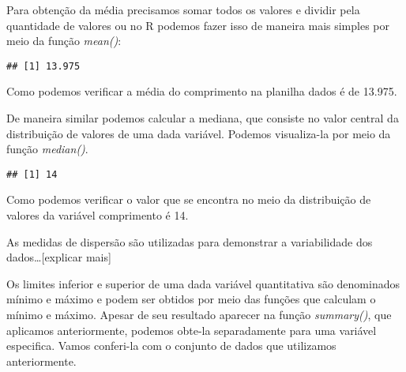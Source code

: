 \documentclass[]{book}
\newenvironment{Shaded}{\begin{snugshade}}{\end{snugshade}}
\newcommand{\KeywordTok}[1]{\textcolor[rgb]{0.13,0.29,0.53}{\textbf{#1}}}
\newcommand{\NormalTok}[1]{#1}
\newcommand{\OperatorTok}[1]{\textcolor[rgb]{0.81,0.36,0.00}{\textbf{#1}}}
\begin{document}
Para obtenção da média precisamos somar todos os valores e dividir pela quantidade de valores ou no R podemos fazer isso de maneira mais simples por meio da função \emph{mean()}:

\begin{Shaded}
\end{Shaded}

\begin{verbatim}
## [1] 13.975
\end{verbatim}

Como podemos verificar a média do comprimento na planilha dados é de 13.975.

De maneira similar podemos calcular a mediana, que consiste no valor central da distribuição de valores de uma dada variável. Podemos visualiza-la por meio da função \emph{median()}.

\begin{Shaded}
\end{Shaded}

\begin{verbatim}
## [1] 14
\end{verbatim}

Como podemos verificar o valor que se encontra no meio da distribuição de valores da variável comprimento é 14.

As medidas de dispersão são utilizadas para demonstrar a variabilidade dos dados\ldots{}{[}explicar mais{]}

Os limites inferior e superior de uma dada variável quantitativa são denominados mínimo e máximo e podem ser obtidos por meio das funções que calculam o mínimo e máximo. Apesar de seu resultado aparecer na função \emph{summary()}, que aplicamos anteriormente, podemos obte-la separadamente para uma variável especifica. Vamos conferi-la com o conjunto de dados que utilizamos anteriormente.

\begin{Shaded}
\end{Shaded}
\end{document}
